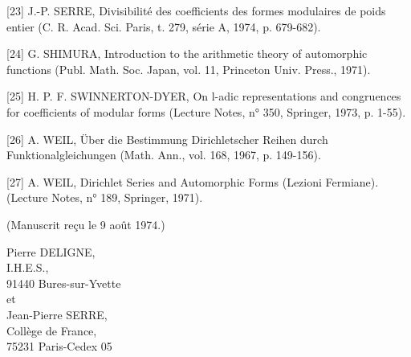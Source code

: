 \documentclass[10pt,oneside]{article}
\newenvironment{DLineBlock}{\par\smallskip\begin{center}\begin{minipage}{0.76\textwidth}\raggedright}{\end{minipage}\end{center}\smallskip}
\begin{document}
[23] J.-P. SERRE, Divisibilité des coefficients des formes modulaires de poids entier (C. R. Acad. Sci. Paris, t. 279, série A, 1974, p. 679-682).\par

[24] G. SHIMURA, Introduction to the arithmetic theory of automorphic functions (Publ. Math. Soc. Japan, vol. 11, Princeton Univ. Press., 1971).\par

[25] H. P. F. SWINNERTON-DYER, On l-adic representations and congruences for coefficients of modular forms (Lecture Notes, n° 350, Springer, 1973, p. 1-55).\par

[26] A. WEIL, Über die Bestimmung Dirichletscher Reihen durch Funktionalgleichungen (Math. Ann., vol. 168, 1967, p. 149-156).\par

[27] A. WEIL, Dirichlet Series and Automorphic Forms (Lezioni Fermiane). (Lecture Notes, n° 189, Springer, 1971).\par

(Manuscrit reçu le 9 août 1974.)\par

\begin{DLineBlock}
Pierre DELIGNE, \\
I.H.E.S., \\
91440 Bures-sur-Yvette \\
et \\
Jean-Pierre SERRE, \\
Collège de France, \\
75231 Paris-Cedex 05
\end{DLineBlock}
\end{document}

